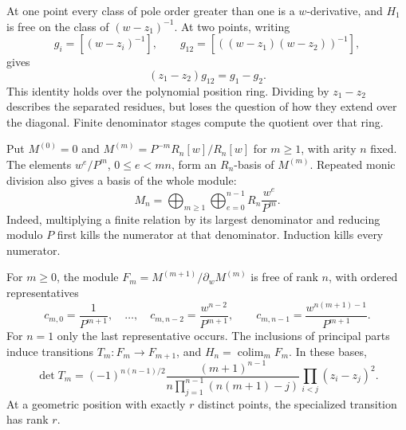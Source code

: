 At one point every class of pole order greater than one is a
$w$-derivative, and $H_1$ is free on the class of
$(w-z_1)^{-1}$.
At two points, writing
\[
 g_i=[(w-z_i)^{-1}],\qquad
 g_{12}=[((w-z_1)(w-z_2))^{-1}],
\]
gives
\begin{equation}\label{cbc:hc:binary-attachment}
 (z_1-z_2)g_{12}=g_1-g_2.
\end{equation}
This identity holds over the polynomial position ring. Dividing by
$z_1-z_2$ describes the separated residues, but loses the question
of how they extend over the diagonal. Finite denominator stages
compute the quotient over that ring.

Put $M^{(0)}=0$ and
$M^{(m)}=P^{-m}R_n[w]/R_n[w]$ for $m\geq1$, with arity $n$ fixed. The elements $w^e/P^m$, $0\leq e<mn$, form an
$R_n$-basis of $M^{(m)}$. Repeated monic division also gives a basis
of the whole module:
\begin{equation}\label{cbc:hc:free-basis}
 M_n=\bigoplus_{m\geq1}\bigoplus_{e=0}^{n-1}
           R_n\frac{w^e}{P^m}.
\end{equation}
Indeed, multiplying a finite relation by its largest denominator
and reducing modulo $P$ first kills the numerator at that
denominator. Induction kills every numerator.

\begin{theorem}\label{cbc:hc:stages}
For $m\geq0$, the module
$F_m=M^{(m+1)}/\partial_wM^{(m)}$ is free of rank $n$, with ordered
representatives
\begin{equation}\label{cbc:hc:stage-basis}
 c_{m,0}=\frac1{P^{m+1}},\quad\ldots,\quad
 c_{m,n-2}=\frac{w^{n-2}}{P^{m+1}},\qquad
 c_{m,n-1}=\frac{w^{n(m+1)-1}}{P^{m+1}}.
\end{equation}
For $n=1$ only the last representative occurs. The inclusions of
principal parts induce transitions $T_m:F_m\to F_{m+1}$, and
$H_n=\operatorname*{colim}_mF_m$. In these bases,
\begin{equation}\label{cbc:hc:transition-determinant}
 \det T_m=(-1)^{n(n-1)/2}
 \frac{(m+1)^{n-1}}
 {n\prod_{j=1}^{n-1}(n(m+1)-j)}
 \prod_{i<j}(z_i-z_j)^2.
\end{equation}
At a geometric position with exactly $r$ distinct points,
the specialized transition has rank $r$.
\end{theorem}

